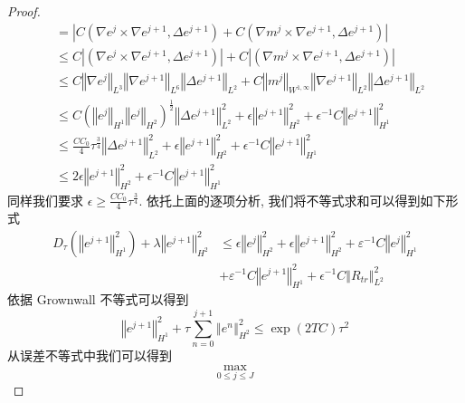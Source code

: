 \documentclass[UTF8,a4paper]{article}
\begin{document}
\begin{proof}
\begin{align*}
                    &=\left| C \left( \nabla e^j\times\nabla e^{j+1},\Delta e^{j+1}\right)+ C \left( \nabla m^j\times\nabla e^{j+1},\Delta e^{j+1}\right) \right|\\
                    &\leq C\left| \left( \nabla e^j\times\nabla e^{j+1},\Delta e^{j+1}\right)\right|+ C\left| \left( \nabla m^j\times\nabla e^{j+1},\Delta e^{j+1}\right) \right|\\
                    &\leq C \left\Vert \nabla e^j\right\Vert_{L^3}\left\Vert \nabla e^{j+1}\right\Vert_{L^6}\left\Vert \Delta e^{j+1}\right\Vert_{L^2}+C \left\Vert m^j\right\Vert_{W^{1,\infty}}\left\Vert \nabla e^{j+1}\right\Vert_{L^2}\left\Vert \Delta e^{j+1}\right\Vert_{L^2}\\
                    &\leq C\left( \left\Vert e^j\right\Vert_{H^1}\left\Vert e^j\right\Vert _{H^2}\right)^{\frac{1}{2}}\left\Vert \Delta e^{j+1}\right\Vert_{L^2}^2+\epsilon \left\Vert e^{j+1}\right\Vert_{H^2}^2+\epsilon^{-1}C \left\Vert e^{j+1}\right\Vert_{H^1}^2\\
                    &\le \frac{C C_0}{4}\tau^{\frac{3}{4}}\left\Vert \Delta e^{j+1}\right\Vert_{L^2}^2+\epsilon \left\Vert e^{j+1}\right\Vert_{H^2}^2+\epsilon^{-1}C \left\Vert e^{j+1}\right\Vert_{H^1}^2\\
  &\leq 2\epsilon \left\Vert e^{j+1}\right\Vert_{H^2}^2+\epsilon^{-1}C \left\Vert e^{j+1}\right\Vert_{H^1}^2
\end{align*}
同样我们要求 $\epsilon\geq \frac{CC_0}{4}\tau^{\frac{3}{4}}$. 依托上面的逐项分析, 我们将不等式求和可以得到如下形式
\begin{align*}
  D_{\tau}\left( \left\Vert e^{j+1}\right\Vert_{H^1}^2\right)+\lambda \left\Vert e^{j+1}\right\Vert_{H^2}^2&\leq\epsilon \left\Vert e^j\right\Vert_{H^2}^2+\epsilon \left\Vert e^{j+1}\right\Vert_{H^2}^2+\varepsilon^{-1}C \left\Vert e^j\right\Vert_{H^1}^2\\
                                                                                  &+\varepsilon^{-1}C \left\Vert e^{j+1}\right\Vert_{H^1}^2+\epsilon^{-1}C \left\Vert R_{tr}\right\Vert_{L^2}^2
\end{align*}
依据 Grownwall 不等式可以得到
\begin{equation*}
\left\Vert e^{j+1}\right\Vert_{H^1}^2+\tau\sum_{n=0}^{j+1}\left\Vert e^n\right\Vert_{H^2}^2\leq \exp(2TC)\tau^2
\end{equation*}
从误差不等式中我们可以得到
\begin{equation*}
\max_{0\leq j\leq J}
\end{equation*}

\end{proof}
\end{document}
